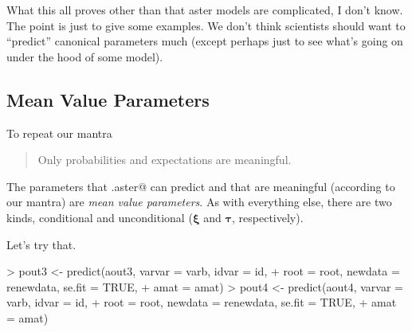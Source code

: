 \documentclass[11pt]{article}
\newcommand{\boldxi}{{\boldsymbol{\xi}}}
\newcommand{\boldtau}{{\boldsymbol{\tau}}}
\begin{document}
What this all proves other than that aster models are complicated, I don't
know.  The point is just to give some examples.  We don't think scientists
should want to ``predict'' canonical parameters much (except perhaps just
to see what's going on under the hood of some model).

\subsection{Mean Value Parameters}

To repeat our mantra
\begin{quote}
Only probabilities and expectations are meaningful.
\end{quote}
The parameters that \verb@predict.aster@ can predict and that are meaningful
(according to our mantra) are \emph{mean value parameters}.  As with everything
else, there are two kinds, conditional and unconditional
($\boldxi$ and $\boldtau$, respectively).

Let's try that.
\begin{Schunk}
\begin{Sinput}
> pout3 <- predict(aout3, varvar = varb, idvar = id, 
+     root = root, newdata = renewdata, se.fit = TRUE, 
+     amat = amat)
> pout4 <- predict(aout4, varvar = varb, idvar = id, 
+     root = root, newdata = renewdata, se.fit = TRUE, 
+     amat = amat)
\end{Sinput}
\end{Schunk}
\end{document}
